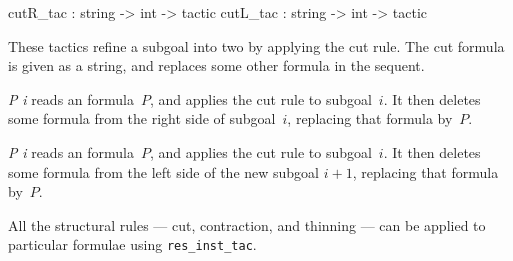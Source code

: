 \begin{ttbox} 
cutR_tac : string -> int -> tactic
cutL_tac : string -> int -> tactic
\end{ttbox}
These tactics refine a subgoal into two by applying the cut rule.  The cut
formula is given as a string, and replaces some other formula in the sequent.
\begin{ttdescription}
\item[\ttindexbold{cutR_tac} {\it P\/} {\it i}] 
reads an \LK{} formula~$P$, and applies the cut rule to subgoal~$i$.  It
then deletes some formula from the right side of subgoal~$i$, replacing
that formula by~$P$.

\item[\ttindexbold{cutL_tac} {\it P\/} {\it i}] 
reads an \LK{} formula~$P$, and applies the cut rule to subgoal~$i$.  It
then deletes some formula from the left side of the new subgoal $i+1$,
replacing that formula by~$P$.
\end{ttdescription}
All the structural rules --- cut, contraction, and thinning --- can be
applied to particular formulae using {\tt res_inst_tac}.


